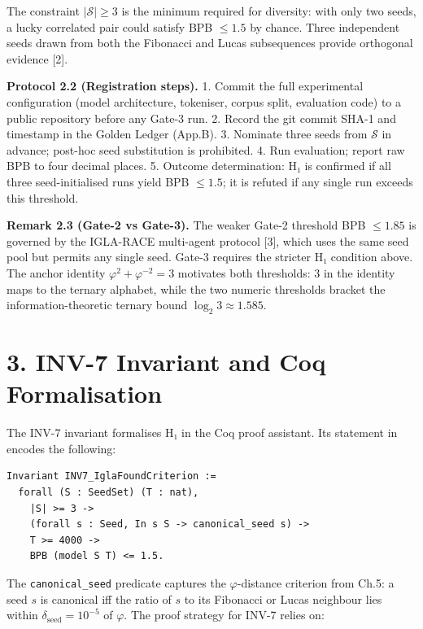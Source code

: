 The constraint \(|\mathcal{S}| \geq 3\) is the
minimum required for diversity: with only two
seeds, a lucky correlated pair could satisfy BPB
\(\leq 1.5\) by chance. Three independent seeds
drawn from both the Fibonacci and Lucas
subsequences provide orthogonal evidence [2].

\textbf{Protocol 2.2 (Registration steps).} 1.
Commit the full experimental configuration (model
architecture, tokeniser, corpus split, evaluation
code) to a public repository before any Gate-3
run. 2. Record the git commit SHA-1 and timestamp
in the Golden Ledger (App.B). 3. Nominate three
seeds from \(\mathcal{S}\) in advance; post-hoc
seed substitution is prohibited. 4. Run
evaluation; report raw BPB to four decimal places.
5. Outcome determination: H₁ is confirmed if all
three seed-initialised runs yield BPB
\(\leq 1.5\); it is refuted if any single run
exceeds this threshold.

\textbf{Remark 2.3 (Gate-2 vs Gate-3).} The weaker
Gate-2 threshold BPB \(\leq 1.85\) is governed by
the IGLA-RACE multi-agent protocol [3], which
uses the same seed pool but permits any single
seed. Gate-3 requires the stricter H₁ condition
above. The anchor identity
\(\varphi^2 + \varphi^{-2} = 3\) motivates both
thresholds: 3 in the identity maps to the ternary
alphabet, while the two numeric thresholds bracket
the information-theoretic ternary bound
\(\log_2 3 \approx 1.585\).

\section{3. INV-7 Invariant and Coq
Formalisation}\label{fa_11:inv-7-invariant-and-coq-formalisation}

The INV-7 invariant formalises H₁ in the Coq proof
assistant. Its statement in
encodes the following:

\begin{verbatim}
Invariant INV7_IglaFoundCriterion :=
  forall (S : SeedSet) (T : nat),
    |S| >= 3 ->
    (forall s : Seed, In s S -> canonical_seed s) ->
    T >= 4000 ->
    BPB (model S T) <= 1.5.
\end{verbatim}

The \texttt{canonical\_seed} predicate captures
the \(\varphi\)-distance criterion from Ch.5: a
seed \(s\) is canonical iff the ratio of \(s\) to
its Fibonacci or Lucas neighbour lies within
\(\delta_{\text{seed}} = 10^{-5}\) of \(\varphi\).
The proof strategy for INV-7 relies on:

